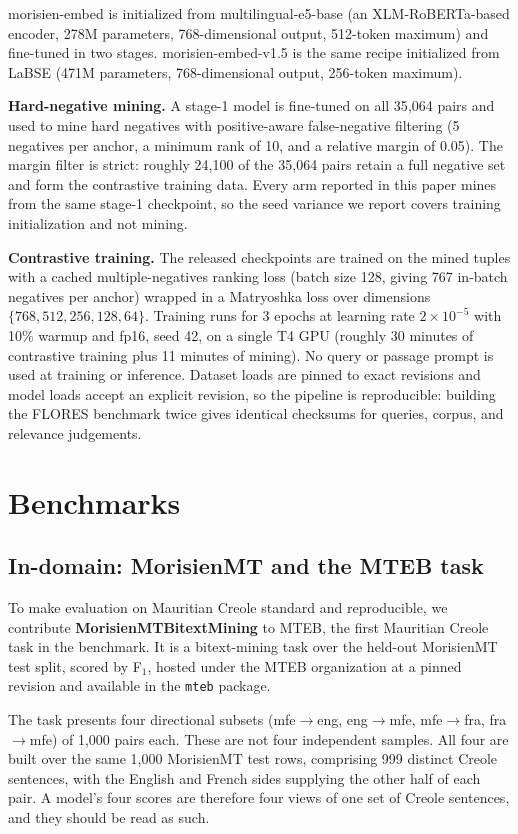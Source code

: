 \documentclass[11pt]{article}
\begin{document}
morisien-embed is initialized from multilingual-e5-base (an XLM-RoBERTa-based encoder, 278M
parameters, 768-dimensional output, 512-token maximum) and fine-tuned in two stages. morisien-embed-v1.5
is the same recipe initialized from LaBSE (471M parameters, 768-dimensional output, 256-token
maximum).

\textbf{Hard-negative mining.} A stage-1 model is fine-tuned on all 35{,}064 pairs and used to mine
hard negatives with positive-aware false-negative filtering (5 negatives per anchor, a minimum rank
of 10, and a relative margin of 0.05). The margin filter is strict: roughly 24{,}100 of the 35{,}064
pairs retain a full negative set and form the contrastive training data. Every arm reported in this
paper mines from the same stage-1 checkpoint, so the seed variance we report covers training
initialization and not mining.

\textbf{Contrastive training.} The released checkpoints are trained on the mined tuples with a cached
multiple-negatives ranking loss (batch size 128, giving 767 in-batch negatives per anchor) wrapped in
a Matryoshka loss over dimensions $\{768, 512, 256, 128, 64\}$. Training runs for 3 epochs at
learning rate $2\times10^{-5}$ with 10\% warmup and fp16, seed 42, on a single T4 GPU (roughly 30
minutes of contrastive training plus 11 minutes of mining). No query or passage prompt is used at
training or inference. Dataset loads are pinned to exact revisions and model loads accept an explicit
revision, so the pipeline is reproducible: building the FLORES benchmark twice gives identical
checksums for queries, corpus, and relevance judgements.

\section{Benchmarks}

\subsection{In-domain: MorisienMT and the MTEB task}
\label{sec:mteb}

To make evaluation on Mauritian Creole standard and reproducible, we contribute
\textbf{MorisienMTBitextMining} to MTEB, the first Mauritian Creole task in the benchmark. It is a
bitext-mining task over the held-out MorisienMT test split, scored by F$_1$, hosted under the MTEB
organization at a pinned revision and available in the \texttt{mteb} package.

The task presents four directional subsets (mfe$\rightarrow$eng, eng$\rightarrow$mfe,
mfe$\rightarrow$fra, fra$\rightarrow$mfe) of 1{,}000 pairs each. These are not four independent
samples. All four are built over the same 1{,}000 MorisienMT test rows, comprising 999 distinct
Creole sentences, with the English and French sides supplying the other half of each pair. A model's
four scores are therefore four views of one set of Creole sentences, and they should be read as such.
\end{document}
